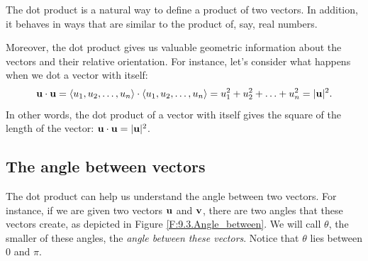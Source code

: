 

The dot product is a natural way to define a product of two vectors.
In addition, it behaves in ways that are similar to the product of,
say, real numbers.

\vspace*{5pt}
\nin 
{}
\vspace*{5pt}

Moreover, the dot product gives us valuable geometric information
about the vectors and their relative orientation.  For instance, let's
consider what happens when we dot a vector with itself:
$$
\mathbf{u}\cdot\mathbf{u} = \langle u_1,u_2,\ldots,u_n \rangle \cdot \langle u_1,u_2,\ldots,u_n \rangle = 
u_1^2 + u_2^2 + \ldots + u_n^2 = |\mathbf{u}|^2.
$$
In other words, the dot product of a vector with itself gives the
square of the length of the vector:  $\mathbf{u}\cdot\mathbf{u}=|\mathbf{u}|^2$.  

\subsection*{The angle between vectors}

The dot product can help us understand the angle between two
vectors.  For instance, if we are given two vectors $\mathbf{u}$ and $\mathbf{v}$,
there are two angles that these vectors create, as depicted in Figure
\ref{F:9.3.Angle_between}. We will call $\theta$, the smaller of these
angles, the \emph{angle between these vectors}.  Notice that
$\theta$ lies between 0 and $\pi$.



